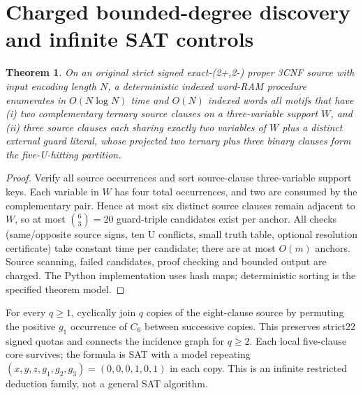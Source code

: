 \documentclass{article}
\newtheorem{theorem}{Theorem}
\begin{document}
\section{Charged bounded-degree discovery and infinite SAT controls}
\begin{theorem}
On an original strict signed exact-(2+,2-) proper 3CNF source with input encoding length $N$, a deterministic indexed word-RAM procedure enumerates in $O(N\log N)$ time and $O(N)$ indexed words all motifs that have (i) two complementary ternary source clauses on a three-variable support $W$, and (ii) three source clauses each sharing exactly two variables of $W$ plus a distinct external guard literal, whose projected two ternary plus three binary clauses form the five-U-hitting partition.
\end{theorem}
\begin{proof}
Verify all source occurrences and sort source-clause three-variable support keys. Each variable in $W$ has four total occurrences, and two are consumed by the complementary pair. Hence at most six distinct source clauses remain adjacent to $W$, so at most $\binom63=20$ guard-triple candidates exist per anchor. All checks (same/opposite source signs, ten U conflicts, small truth table, optional resolution certificate) take constant time per candidate; there are at most $O(m)$ anchors. Source scanning, failed candidates, proof checking and bounded output are charged. The Python implementation uses hash maps; deterministic sorting is the specified theorem model.
\end{proof}
For every $q\ge1$, cyclically join $q$ copies of the eight-clause source by permuting the positive $g_1$ occurrence of $C_6$ between successive copies. This preserves strict22 signed quotas and connects the incidence graph for $q\ge2$. Each local five-clause core survives; the formula is SAT with a model repeating $(x,y,z,g_1,g_2,g_3)=(0,0,0,1,0,1)$ in each copy. This is an infinite restricted deduction family, not a general SAT algorithm.
\end{document}
